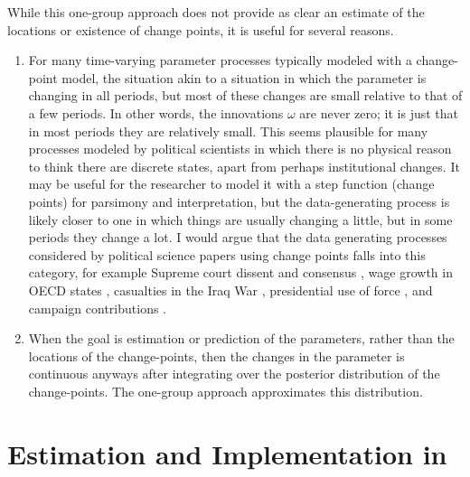 While this one-group approach does not provide as clear an estimate of the locations or existence of change points, it is useful for several reasons.
\begin{enumerate}
\item For many time-varying parameter processes typically modeled with a change-point model, the situation akin to a situation in which the parameter is changing in all periods, but most of these changes are small relative to that of a few periods.
  In other words, the innovations $\omega$ are never zero; it is just that in most periods they are relatively small.
  This seems plausible for many processes modeled by political scientists in which there is no physical reason to think there are discrete states, apart from perhaps institutional changes.
  It may be useful for the researcher to model it with a step function (change points) for parsimony and interpretation, but the data-generating process is likely closer to one in which things are usually changing a little, but in some periods they change a lot. 
  I would argue that the data generating processes considered by political science papers using change points falls into this category, for example Supreme court dissent and consensus \parencite{CalderiaZorn1998}, wage growth in OECD states \parencite{WesternKleykamp2004}, casualties in the Iraq War \parencite{Spirling2007a}, presidential use of force \parencite{Park2010}, and campaign contributions \parencite{Blackwell2012}.
\item When the goal is estimation or prediction of the parameters, rather than the locations of the change-points, then the changes in the parameter is continuous anyways after integrating over the posterior distribution of the change-points. 
  The one-group approach approximates this distribution.
\end{enumerate}


\section{Estimation and Implementation in \Stan{}}
\label{dlm:sec:estimation}

